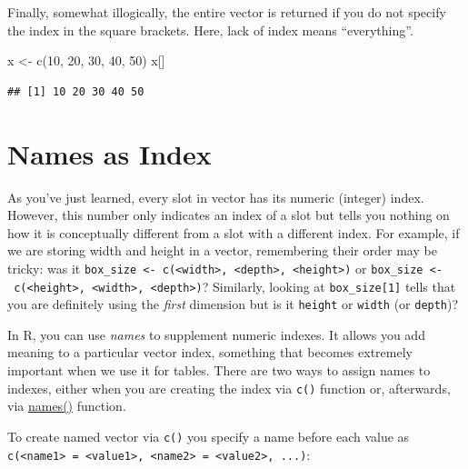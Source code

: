 \documentclass[
]{book}
\newenvironment{Shaded}{\begin{snugshade}}{\end{snugshade}}
\newcommand{\DecValTok}[1]{\textcolor[rgb]{0.00,0.00,0.81}{#1}}
\newcommand{\FunctionTok}[1]{\textcolor[rgb]{0.00,0.00,0.00}{#1}}
\newcommand{\NormalTok}[1]{#1}
\newcommand{\OtherTok}[1]{\textcolor[rgb]{0.56,0.35,0.01}{#1}}
\begin{document}
Finally, somewhat illogically, the entire vector is returned if you do not specify the index in the square brackets. Here, lack of index means ``everything''.

\begin{Shaded}
\begin{Highlighting}[]
\NormalTok{x }\OtherTok{\textless{}{-}} \FunctionTok{c}\NormalTok{(}\DecValTok{10}\NormalTok{, }\DecValTok{20}\NormalTok{, }\DecValTok{30}\NormalTok{, }\DecValTok{40}\NormalTok{, }\DecValTok{50}\NormalTok{)}
\NormalTok{x[]}
\end{Highlighting}
\end{Shaded}

\begin{verbatim}
## [1] 10 20 30 40 50
\end{verbatim}

\hypertarget{names-as-index}{%
\section{Names as Index}\label{names-as-index}}

As you've just learned, every slot in vector has its numeric (integer) index. However, this number only indicates an index of a slot but tells you nothing on how it is conceptually different from a slot with a different index. For example, if we are storing width and height in a vector, remembering their order may be tricky: was it \texttt{box\_size\ \textless{}-\ c(\textless{}width\textgreater{},\ \textless{}depth\textgreater{},\ \textless{}height\textgreater{})} or \texttt{box\_size\ \textless{}-\ c(\textless{}height\textgreater{},\ \textless{}width\textgreater{},\ \textless{}depth\textgreater{})}? Similarly, looking at \texttt{box\_size{[}1{]}} tells that you are definitely using the \emph{first} dimension but is it \texttt{height} or \texttt{width} (or \texttt{depth})?

In R, you can use \emph{names} to supplement numeric indexes. It allows you add meaning to a particular vector index, something that becomes extremely important when we use it for tables. There are two ways to assign names to indexes, either when you are creating the index via \texttt{c()} function or, afterwards, via \href{https://www.rdocumentation.org/packages/base/versions/3.6.2/topics/names}{names()} function.

To create named vector via \texttt{c()} you specify a name before each value as \texttt{c(\textless{}name1\textgreater{}\ =\ \textless{}value1\textgreater{},\ \textless{}name2\textgreater{}\ =\ \textless{}value2\textgreater{},\ ...)}:
\end{document}
